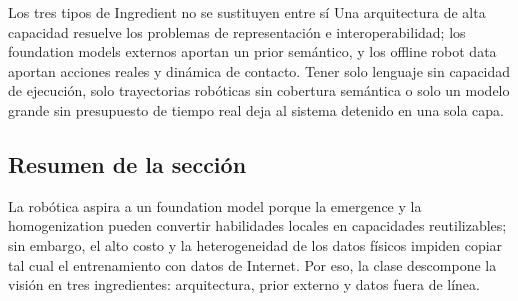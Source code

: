
\begin{importantbox}{Los tres tipos de Ingredient no se sustituyen entre sí}
Una arquitectura de alta capacidad resuelve los problemas de representación e interoperabilidad; los foundation models externos aportan un prior semántico, y los offline robot data aportan acciones reales y dinámica de contacto. Tener solo lenguaje sin capacidad de ejecución, solo trayectorias robóticas sin cobertura semántica o solo un modelo grande sin presupuesto de tiempo real deja al sistema detenido en una sola capa.
\end{importantbox}

\subsection{Resumen de la sección}

La robótica aspira a un foundation model porque la emergence y la homogenization pueden convertir habilidades locales en capacidades reutilizables; sin embargo, el alto costo y la heterogeneidad de los datos físicos impiden copiar tal cual el entrenamiento con datos de Internet. Por eso, la clase descompone la visión en tres ingredientes: arquitectura, prior externo y datos fuera de línea.
